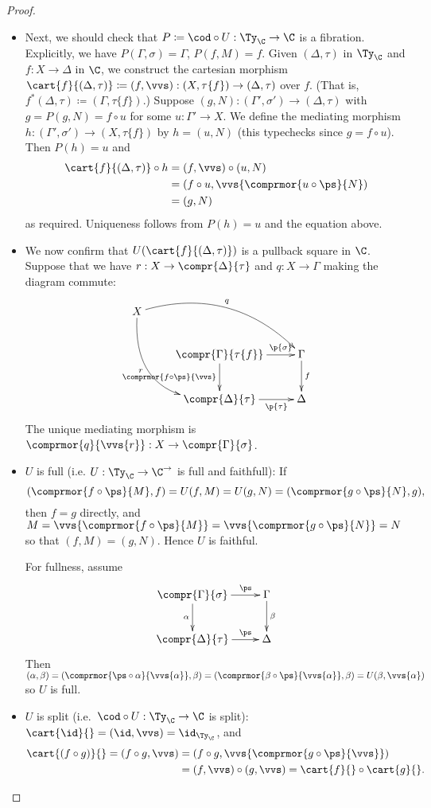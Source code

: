 \documentclass{article}
\begin{document}
\begin{proof}
\begin{itemize}
\item Next, we should check that $P \coloneqq \cod \circ U : \Ty_{\C} \to \C$
  is a fibration. Explicitly, we have $P(\Gamma, \sigma) = \Gamma$,
  $P(f, M) = f$. Given $(\Delta, \tau)$ in $\Ty_{\C}$ and $f : X \to
  \Delta$ in $\C$, we construct the cartesian morphism
  $\cart{f}{(\Delta, \tau)} \coloneqq (f, \vvs) : (X, \tau\{f\}) \to
  (\Delta, \tau)$ over $f$. (That is, $f^* (\Delta, \tau) \coloneqq
  (\Gamma, \tau\{f\})$.)  Suppose $(g, N) : (\Gamma', \sigma') \to
  (\Delta, \tau)$ with $g = P(g, N) = f \circ u$ for some $u : \Gamma'
  \to X$.  We define the mediating morphism $h : (\Gamma', \sigma')
  \to (X, \tau\{f\})$ by $h = (u, N)$ (this typechecks since $g = f
  \circ u$). Then $P(h) = u$ and
\begin{align*}
\cart{f}{(\Delta, \tau)} \circ h
  & = (f, \vvs) \circ (u, N) \\
  & = (f \circ u, \vvs\{\comprmor{u \circ \ps}{N}) \\
  & = (g, N)
\end{align*}
as required. Uniqueness follows from $P(h) = u$ and the equation above.
\item We now confirm that $U(\cart{f}{(\Delta, \tau)})$ is a pullback
  square in $\C$. Suppose that we have $r : X \to
  \compr{\Delta}{\tau}$ and $q : X \to \Gamma$ making the diagram commute:
\[
\xymatrix{
X \ar_-{r}@/_2.5pc/[ddr] \ar^-{q}@/^2pc/[drr] & & \\
& \compr{\Gamma}{\tau\{f\}} \ar^-{\p{\sigma}}[r] \ar_-{\comprmor{f \circ \ps}{\vvs}}[d] & \Gamma \ar^-{f}[d] \\
& \compr{\Delta}{\tau} \ar_-{\p{\tau}}[r] & \Delta
}
\]
%
The unique mediating morphism is $\comprmor{q}{\vvs\{r\}} : X \to \compr{\Gamma}{\sigma}$.
\item $U$ is full (i.e. $U : \Ty_{\C} \to \C^{\rightarrow}$ is full
  and faithfull): If $$(\comprmor{f \circ \ps}{M}, f) = U(f, M) = U(g,
  N) = (\comprmor{g \circ \ps}{N}, g),$$ then $f = g$ directly, and $M
  = \vvs\{\comprmor{f \circ \ps}{M}\} = \vvs\{\comprmor{g \circ
    \ps}{N}\} = N$ so that $(f, M) = (g, N)$. Hence $U$ is faithful.

  For fullness, assume
\[
\xymatrix{
\compr{\Gamma}{\sigma} \ar^-{\ps}[r] \ar_-{\alpha}[d] & \Gamma \ar^-{\beta}[d] \\
\compr{\Delta}{\tau} \ar^-{\ps}[r] & \Delta 
}
\]
Then $(\alpha, \beta) = (\comprmor{\ps \circ \alpha}{\vvs\{\alpha\}},
\beta) = (\comprmor{\beta \circ \ps}{\vvs\{\alpha\}}, \beta) =
U(\beta, \vvs\{\alpha\})$ so $U$ is full.

\item $U$ is split (i.e.\ $\cod \circ U : \Ty_{\C} \to \C$ is split):
  $\cart{\id}{} = (\id, \vvs) = \id_{\Ty_{\C}}$, and
  \begin{align*}
    \cart{(f \circ g)}{}
 = (f \circ g, \vvs) 
& = (f \circ g, \vvs\{\comprmor{g \circ \ps}{\vvs}\}) \\
& = (f, \vvs) \circ (g, \vvs) 
 = \cart{f}{} \circ \cart{g}{}.
  \end{align*}
\end{itemize}
\end{proof}
\end{document}
